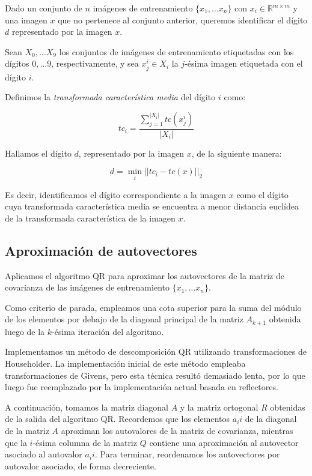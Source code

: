 \documentclass[a4paper,10pt,twoside]{article}
\newcommand{\real}{\mathbb{R}}
\begin{document}
Dado un conjunto de $n$ imágenes de entrenamiento $\{x_1, \ldots x_n\}$ con $x_i \in \real^{m \times m}$ y una imagen $x$ que no pertenece al conjunto anterior, queremos identificar el dígito $d$ representado por la imagen $x$.

Sean $X_0, \ldots X_9$ los conjuntos de imágenes de entrenamiento etiquetadas con los dígitos $0, \ldots 9$, respectivamente, y sea $x_j^i \in X_i$ la $j$-ésima imagen etiquetada con el dígito $i$.

Definimos la \textit{transformada característica media} del dígito $i$ como:

$$
tc_i = \frac{\sum_{j=1}^{|X_i|}{tc(x_j^i)}}
            {|X_i|}
$$

Hallamos el dígito $d$, representado por la imagen $x$, de la siguiente manera:

$$
d = \min_{i} || tc_i - tc(x) ||_2
$$

Es decir, identificamos el dígito correspondiente a la imagen $x$ como el dígito cuya transformada característica media se encuentra a menor distancia euclídea de la transformada característica de la imagen $x$.


\subsection{Aproximación de autovectores}

Aplicamos el algoritmo QR para aproximar los autovectores de la matriz de covarianza de las imágenes de entrenamiento $\{x_1, \ldots x_n\}$. 

Como criterio de parada, empleamos una cota superior para la suma del módulo de los elementos por debajo de la diagonal principal de la matriz $A_{k+1}$ obtenida luego de la $k$-ésima iteración del algoritmo.

Implementamos un método de descomposición QR utilizando transformaciones de Householder. La implementación inicial de este método empleaba transformaciones de Givens, pero esta técnica resultó demasiado lenta, por lo que luego fue reemplazado por la implementación actual basada en reflectores.

A continuación, tomamos la matriz diagonal $A$ y la matriz ortogonal $R$ obtenidas de la salida del algoritmo QR. Recordemos que los elementos $a_ii$ de la diagonal de la matriz $A$ aproximan los autovalores de la matriz de covarianza, mientras que la $i$-ésima columna de la matriz $Q$ contiene una aproximación al autovector asociado al autovalor $a_ii$. Para terminar, reordenamos los autovectores por autovalor asociado, de forma decreciente.
\end{document}
